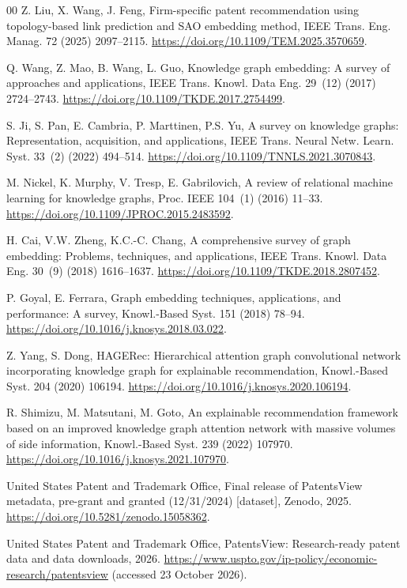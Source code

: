 \documentclass[preprint,12pt,3p]{elsarticle}
\begin{document}
\begin{thebibliography}{00}
Z. Liu, X. Wang, J. Feng, Firm-specific patent recommendation using topology-based link prediction and SAO embedding method, IEEE Trans. Eng. Manag. 72 (2025) 2097--2115. \url{https://doi.org/10.1109/TEM.2025.3570659}.

Q. Wang, Z. Mao, B. Wang, L. Guo, Knowledge graph embedding: A survey of approaches and applications, IEEE Trans. Knowl. Data Eng. 29~(12) (2017) 2724--2743. \url{https://doi.org/10.1109/TKDE.2017.2754499}.

S. Ji, S. Pan, E. Cambria, P. Marttinen, P.S. Yu, A survey on knowledge graphs: Representation, acquisition, and applications, IEEE Trans. Neural Netw. Learn. Syst. 33~(2) (2022) 494--514. \url{https://doi.org/10.1109/TNNLS.2021.3070843}.

M. Nickel, K. Murphy, V. Tresp, E. Gabrilovich, A review of relational machine learning for knowledge graphs, Proc. IEEE 104~(1) (2016) 11--33. \url{https://doi.org/10.1109/JPROC.2015.2483592}.

H. Cai, V.W. Zheng, K.C.-C. Chang, A comprehensive survey of graph embedding: Problems, techniques, and applications, IEEE Trans. Knowl. Data Eng. 30~(9) (2018) 1616--1637. \url{https://doi.org/10.1109/TKDE.2018.2807452}.

P. Goyal, E. Ferrara, Graph embedding techniques, applications, and performance: A survey, Knowl.-Based Syst. 151 (2018) 78--94. \url{https://doi.org/10.1016/j.knosys.2018.03.022}.

Z. Yang, S. Dong, {HAGERec}: Hierarchical attention graph convolutional network incorporating knowledge graph for explainable recommendation, Knowl.-Based Syst. 204 (2020) 106194. \url{https://doi.org/10.1016/j.knosys.2020.106194}.

R. Shimizu, M. Matsutani, M. Goto, An explainable recommendation framework based on an improved knowledge graph attention network with massive volumes of side information, Knowl.-Based Syst. 239 (2022) 107970. \url{https://doi.org/10.1016/j.knosys.2021.107970}.

United States Patent and Trademark Office, Final release of PatentsView metadata, pre-grant and granted (12/31/2024) [dataset], Zenodo, 2025. \url{https://doi.org/10.5281/zenodo.15058362}.

United States Patent and Trademark Office, PatentsView: Research-ready patent data and data downloads, 2026. \url{https://www.uspto.gov/ip-policy/economic-research/patentsview} (accessed 23 October 2026).

\end{thebibliography}
\end{document}
